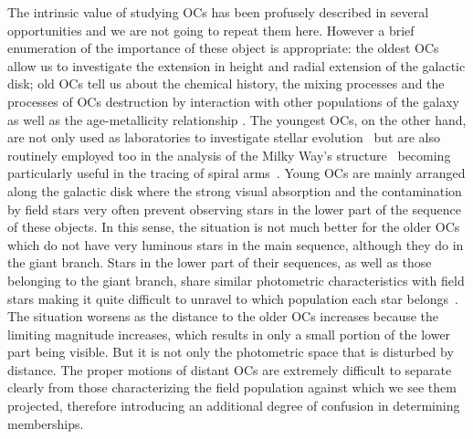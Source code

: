 \documentclass{aa}
\begin{document}
 The intrinsic value of studying OCs has been profusely described in several
 opportunities and we are not going to repeat them here. However a brief
 enumeration of the importance of these object is appropriate: the oldest OCs
 allow us to investigate the extension in height and radial extension of the
 galactic disk; old OCs tell us about the chemical history, the mixing processes
 and the processes of OCs destruction by interaction with other populations of
 the galaxy as well as the age-metallicity relationship 
 \citep{Friel1995,Tosi_2004,Hayes_2015}. The youngest OCs, on the other hand, are
 not only used as laboratories to investigate stellar evolution~\citep[they allow
 studying in detail the boundary conditions necessary to create new generations
 of stars, ][]{Lada2003} but are also routinely employed too in the analysis
 of the Milky Way's
 structure~\citep{Loktin_1992,Moitinho_2006,Vazquez2008,Moitinho_2010}
 becoming particularly useful in the tracing of spiral
 arms~\citep{carraro_2013,Molina_2018}.
 Young OCs are mainly arranged along the galactic disk where the strong visual
 absorption and the contamination by field stars very often prevent observing
 stars in the lower part of the sequence of these objects.
 In this sense, the situation is not much better for the older OCs which do not
 have very luminous stars in the main sequence, although they do in the giant
 branch. Stars in the lower part of their sequences, as well as those belonging
 to the giant branch, share similar photometric characteristics with field stars
 making it quite difficult to unravel to which population each star
 belongs~\citep{Hayes_2015}.
 The situation worsens as the distance to the older OCs increases because the
 limiting magnitude increases, which results in only a small portion of
 the lower part being visible. But it is not only the photometric
 space that is disturbed by distance. The proper motions of distant OCs are
 extremely difficult to separate clearly from those characterizing the field
 population against which we see them projected, therefore introducing an
 additional degree of confusion in determining memberships.
\end{document}
